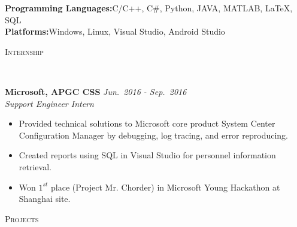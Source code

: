 \documentclass[10pt]{article}
\newenvironment{changemargin}[2]{%
  \begin{list}{}{%
    \setlength{\topsep}{0pt}%
    \setlength{\leftmargin}{#1}%
    \setlength{\rightmargin}{#2}%
    \setlength{\listparindent}{\parindent}%
    \setlength{\itemindent}{\parindent}%
    \setlength{\parsep}{\parskip}%
  }%
  \item[]}{\end{list}
}
\newcommand{\lineover}{
	\begin{changemargin}{-0.05in}{-0.05in}
		\vspace*{-8pt}
		\hrulefill \\
		\vspace*{-2pt}
	\end{changemargin}
}
\newcommand{\header}[1]{
	\begin{changemargin}{-0.7in}{-0.65in}
		\scshape{\large{#1}}\\
  	\lineover
	\end{changemargin}
}
\newenvironment{body} {
	\vspace*{-16pt}
	\begin{changemargin}{-0.65in}{-0.62in}
  }	
	{\end{changemargin}
}
\begin{document}
\begin{body}
	\vspace{14pt}
	\textbf{Programming Languages:\hspace{10pt}}C/C++, C\#, Python, JAVA, MATLAB, \LaTeX, SQL\\
	\textbf{Platforms:\hspace{85pt}}Windows, Linux, Visual Studio, Android Studio\\
	
\end{body}

\smallskip
\vspace{-4pt}

\header{Internship}

\begin{body}
	\vspace{14pt}
	
	\textbf{Microsoft, APGC CSS} \hfill \emph{Jun.~2016 - Sep.~2016} \\
	\textit{Support Engineer Intern} 
	\vspace*{-5pt}
	\vspace*{2pt}
	\begin{itemize} \itemsep -0pt		
		
		\item Provided technical solutions to Microsoft core product System Center Configuration Manager by debugging, log tracing, and error reproducing.
		\item Created reports using SQL in Visual Studio for personnel information retrieval.
		\item Won $1^{st}$ place (Project Mr. Chorder) in Microsoft Young Hackathon at Shanghai site.
	\end{itemize}


\end{body}

\smallskip
\vspace{-8pt}

\header{Projects}
\end{document}
